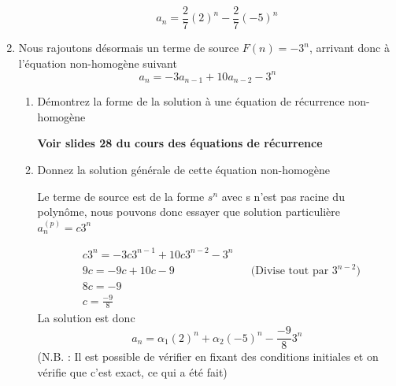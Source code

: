 \documentclass[A4paper,11pt]{article}
\begin{document}
\begin{enumerate}
\begin{enumerate}
        \[
            a_n = \frac{2}{7} (2)^n - \frac{2}{7} (-5)^n
        \]
    \end{enumerate}
    \item Nous rajoutons désormais un terme de source $F(n) = - 3^n$, arrivant donc à l'équation non-homogène suivant
    \[ a_n = -3a_{n-1} + 10a_{n-2} - 3^n\]
    \begin{enumerate}
        \item Démontrez la forme de la solution à une équation de récurrence non-homogène
        
        \textbf{Voir slides 28 du cours des équations de récurrence}
         \item Donnez la solution générale de cette équation non-homogène
         
         Le terme de source est de la forme $s^n$ avec s n'est pas racine du polynôme, nous pouvons donc essayer que solution particulière $a_n^{(p)} = c3^n$
         
         \begin{align*}
             &c3^n = -3c3^{n-1} + 10c3^{n-2} -3^n\\
             & 9c = -9c + 10c - 9 &&\text{(Divise tout par }3^{n-2})\\
             & 8c = -9\\
             & c = \frac{-9}{8}
         \end{align*}
         La solution est donc \[
         a_n = \alpha_1 (2)^n + \alpha_2 (-5)^n - \frac{-9}{8}3^n
         \]
         (N.B. : Il est possible de vérifier en fixant des conditions initiales et on vérifie que c'est exact, ce qui a été fait)
    \end{enumerate}
\end{enumerate}
\end{document}
